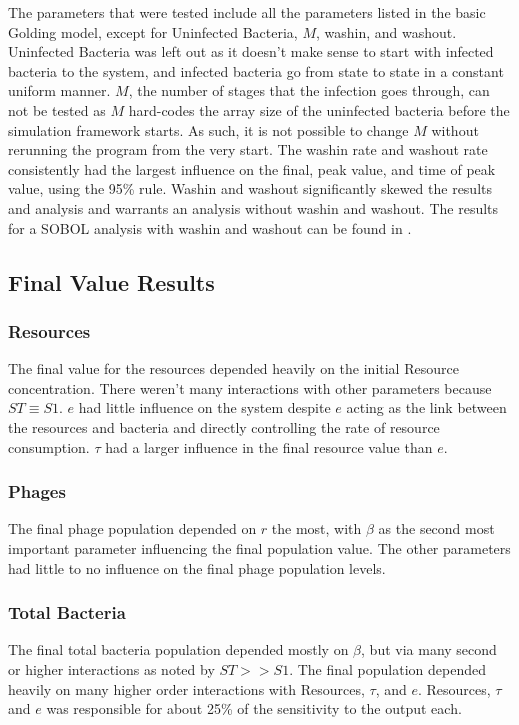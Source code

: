 The parameters that were tested include all the parameters listed in the basic Golding model, except for Uninfected Bacteria, $M$, washin, and washout. 
Uninfected Bacteria was left out as it doesn't make sense to start with infected bacteria to the system, and infected bacteria go from state to state in a constant uniform manner. 
$M$, the number of stages that the infection goes through, can not be tested as $M$ hard-codes the array size of the uninfected bacteria before the simulation framework starts. 
As such, it is not possible to change $M$ without rerunning the program from the very start. 
The washin rate and washout rate consistently had the largest influence on the final, peak value, and time of peak value, using the 95\% rule. 
Washin and washout significantly skewed the results and analysis and warrants an analysis without washin and washout. 
The results for a SOBOL analysis with washin and washout can be found in . 


\subsection{Final Value Results}
\subsubsection{Resources}
The final value for the resources depended heavily on the initial Resource concentration. 
There weren't many interactions with other parameters because $ST \equiv S1$. 
$e$ had little influence on the system despite $e$ acting as the link between the resources and bacteria and directly controlling the rate of resource consumption. 
$\tau$ had a larger influence in the final resource value than $e$. 
\subsubsection{Phages}
The final phage population depended on $r$ the most, with $\beta$ as the second most important parameter influencing the final population value. 
The other parameters had little to no influence on the final phage population levels. 
\subsubsection{Total Bacteria}
The final total bacteria population depended mostly on $\beta$, but via many second or higher interactions as noted by $ST >> S1$. 
The final population depended heavily on many higher order interactions with Resources, $\tau$, and $e$. 
Resources, $\tau$ and $e$ was responsible for about 25\% of the sensitivity to the output each. 

